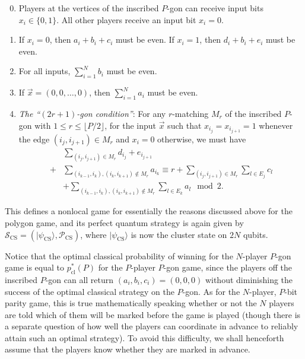 \documentclass[prb,twocolumn,showpacs,amssymb,superscriptaddress]{revtex4-2}
\begin{document}
\begin{enumerate}
\setcounter{enumi}{-1}
    \item Players at the vertices of the inscribed $P$-gon can receive input bits $x_i \in \{0,1\}$. All other players receive an input bit $x_i=0$.
    \item If $x_i=0$, then $a_i+b_i+c_i$ must be even. If $x_i=1$, then $d_i + b_i + e_i$ must be even.
    \item For all inputs, $\sum_{i=1}^N b_i$ must be even. 
    \item If $\vec{x} = (0,0,\ldots,0)$, then $\sum_{i=1}^N a_i$ must be even.
    \item \emph{The ``$(2r+1)$-gon condition''}: For any $r$-matching $M_r$ of the inscribed $P$-gon with $1 \leq r \leq \lfloor P/2 \rfloor$, for the input $\vec{x}$ such that $x_{i_j} = x_{i_{j+1}} = 1$ whenever the edge $(i_j,i_{j+1}) \in M_r$ and $x_i=0$ otherwise, we must have
    \begin{align}
    \nonumber
    &\sum_{(i_j,i_{j+1})\in M_r} d_{i_j}+e_{i_{j+1}} \\+
    \nonumber &\sum_{(i_{k-1},i_k),(i_k,i_{k+1}) \notin M_r} a_{i_k}
    \equiv r + \sum_{(i_j,i_{j+1})\in M_r} \sum_{l\in E_j} c_l \\
    &+ \sum_{(i_{k-1},i_k),(i_k,i_{k+1}) \notin M_r} \sum_{l\in E_k} a_l \mod{2}.
    \end{align}
\end{enumerate}

This defines a nonlocal game for essentially the reasons discussed above for the polygon game, and its perfect quantum strategy is again given by $\mathcal{S}_{\mathrm{CS}} = (|\psi_{\mathrm{CS}}\rangle,\mathcal{P}_{\mathrm{CS}})$, where $|\psi_{\mathrm{CS}}\rangle$ is now the cluster state on $2N$ qubits.

Notice that the optimal classical probability of winning for the $N$-player $P$-gon game is equal to $p_{\mathrm{cl}}^*(P)$ for the $P$-player $P$-gon game, since the players off the inscribed $P$-gon can all return $(a_i,b_i,c_i) = (0,0,0)$ without diminishing the success of the optimal classical strategy on the $P$-gon. As for the $N$-player, $P$-bit parity game, this is true mathematically speaking whether or not the $N$ players are told which of them will be marked before the game is played (though there is a separate question of how well the players can coordinate in advance to reliably attain such an optimal strategy). To avoid this difficulty, we shall henceforth assume that the players know whether they are marked in advance.
\end{document}
